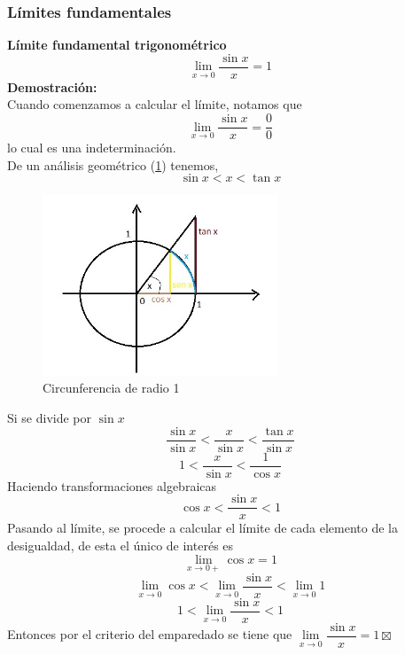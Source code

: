 \documentclass[10pt,twoside]{SelfArx} %
\begin{document}
\subsubsection{Límites fundamentales}

\textbf{Límite fundamental trigonométrico}\\
\[ \lim\limits_{x\rightarrow0}\dfrac{\sin x}{x}=1 \]
\textbf{Demostración:}\\
Cuando comenzamos a calcular el límite, notamos que
\[ \lim\limits_{x\rightarrow0}\dfrac{\sin x}{x}=\dfrac{0}{0} \]
lo cual es una indeterminación.\\
De un análisis geométrico (\ref{limite_fundamental}) tenemos,
\begin{equation}
 \sin x< x<\tan x 
\end{equation}

\begin{figure}[h]
	\centering
	\includegraphics[width=7cm]{limite_fundamental}
	\caption{Circunferencia de radio 1}
	\label{limite_fundamental}
\end{figure}
Si se divide por $ \sin x $
\begin{equation}
 \dfrac{\sin x}{\sin x}< \dfrac{x}{\sin x}<\dfrac{\tan x }{\sin x}
\end{equation}
\begin{equation}
1< \dfrac{x}{\sin x}<\dfrac{1}{\cos x}
\end{equation}
Haciendo transformaciones algebraicas
\begin{equation}
\cos x<\dfrac{\sin x}{x}<1
\end{equation}
Pasando al límite, se procede a calcular el límite de cada elemento de la desigualdad, de esta el único de interés es 
\[ \lim\limits_{x\rightarrow0+}\cos x =1 \]
\begin{equation}
\lim\limits_{x\rightarrow0}\cos x
<\lim\limits_{x\rightarrow0}\dfrac{\sin x}{x}
<\lim\limits_{x\rightarrow0}1
\end{equation}
\begin{equation}
1<\lim\limits_{x\rightarrow0}\dfrac{\sin x}{x}<1
\end{equation}
Entonces por el criterio del emparedado se tiene que $ \lim\limits_{x\rightarrow0}\dfrac{\sin x}{x}=1 \boxtimes$\\
\end{document}
